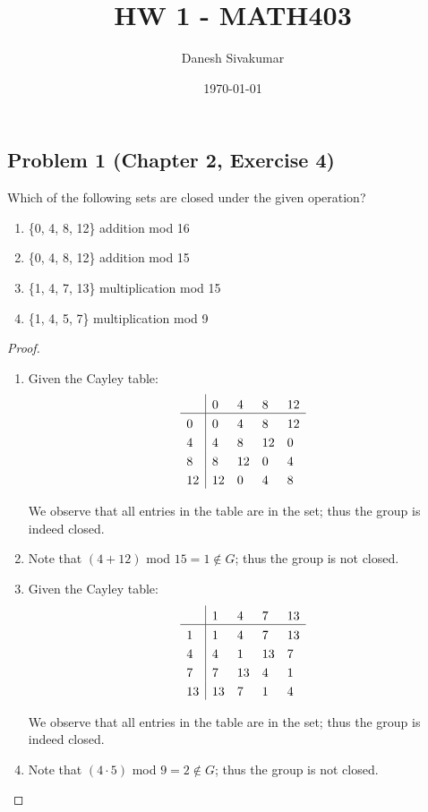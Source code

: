 \documentclass{article}
\title{HW 1 - MATH403}
\author{Danesh Sivakumar}
\date\today
\begin{document}
\maketitle 


\subsection*{Problem 1 (Chapter 2, Exercise 4)}
Which of the following sets are closed under the given operation?
\begin{enumerate}[label=(\alph*)]
\item \{0, 4, 8, 12\} addition mod 16
\item \{0, 4, 8, 12\} addition mod 15
\item \{1, 4, 7, 13\} multiplication mod 15
\item \{1, 4, 5, 7\} multiplication mod 9
\end{enumerate}
\begin{proof}
$ $
\begin{enumerate}[label=(\alph*)]
\item
Given the Cayley table:
\[
    \setlength{\extrarowheight}{3pt}
    \begin{array}{l|*{4}{l}}
        & 0   & 4   & 8  & 12  \\
    \hline
    0   & 0   & 4   & 8  & 12  \\
    4   & 4   & 8   & 12 & 0  \\
    8   & 8   & 12  & 0  & 4  \\
    12  & 12  & 0   & 4  & 8  \\
    \end{array} 
\]

We observe that all entries in the table are in the set; thus the group is indeed closed.

\item 
Note that $(4+12)$ mod $15 = 1 \notin G$; thus the group is not closed.

\item 
Given the Cayley table:
\[
    \setlength{\extrarowheight}{3pt}
    \begin{array}{l|*{4}{l}}
        & 1   & 4   & 7  & 13  \\
    \hline
    1   & 1   & 4   & 7  & 13  \\
    4   & 4   & 1   & 13 & 7  \\
    7   & 7   & 13  & 4  & 1  \\
    13  & 13  & 7   & 1  & 4  \\
    \end{array} 
\]

We observe that all entries in the table are in the set; thus the group is indeed closed.

\item
Note that $(4 \cdot 5)$ mod $9 = 2 \notin G$; thus the group is not closed.

\end{enumerate}

\end{proof}
\end{document}
